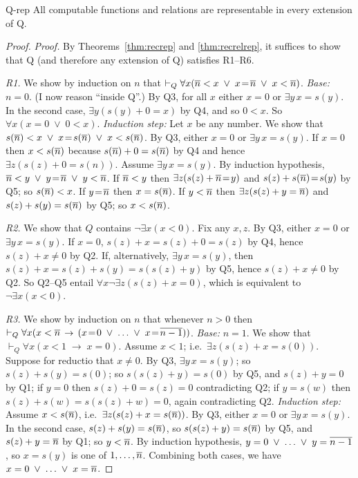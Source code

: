 \begin{theorem}{}{Q-rep}
  All computable functions and relations are representable in every extension of Q.
\end{theorem}
\begin{proof}
  \emph{Proof.}
  By Theorems~\ref{thm:recrep} and \ref{thm:recrelrep},
  it suffices to show that Q (and therefore any extension of Q) satisfies R1--R6.

  \emph{R1.} %
  We show by induction on $n$ that $\vdash_Q \forall x (\overline{n} < x \;\lor\; x\!=\!\overline{n} \;\lor\; x < \overline{n})$.
  \emph{Base:} $n=0$.
  (I now reason ``inside Q''.)
  By Q3,
  for all $x$ either $x=0$ or $\exists y\, x=s(y)$.
  In the second case,
  $\exists y (s(y) + 0\!=\!x)$ by Q4,
  and so $0<x$.
  So $\forall x(x\!=\!0 \;\lor\; 0 < x)$.
  \emph{Induction step:}
  Let $x$ be any number.
  We show that $s(\overline{n}) < x \;\lor\; x\!=\!s(\overline{n}) \;\lor\; x < s(\overline{n})$.
  By Q3,
  either $x=0$ or $\exists y\, x=s(y)$.
  If $x=0$ then $x < s(\overline{n})$ because
  $s(\overline{n}) + 0=s(\overline{n})$ by Q4 and hence $\exists z(s(z) + 0=s(n))$.
  Assume $\exists y\, x=s(y)$.
  By induction hypothesis,
  $\overline{n} < y \;\lor\; y\!=\!\overline{n} \;\lor\; y < \overline{n}$.
  If $\overline{n} < y$ then
  $\exists z(s(z) + \overline{n}\!=\!y)$ and
  $s(z) + s(\overline{n})\!=\!s(y)$ by Q5;
  so $s(\overline{n}) < x$.
  If $y\!=\!\overline{n}$ then $x = s(\overline{n})$.
  If $y < \overline{n}$ then
  $\exists z(s(z) + y = \overline{n})$ and
  $s(z) + s(y) = s(\overline{n})$ by Q5;
  so $x < s(\overline{n})$.

  \smallskip%
  \emph{R2.}
  We show that $Q$ contains $\neg \exists x (x < 0)$.
  Fix any $x,z$.
  By Q3, either $x = 0$ or $\exists y\, x = s(y)$.
  If $x=0$,
  $s(z) + x = s(z) + 0 = s(z)$ by Q4, hence $s(z) + x \neq 0$ by Q2.
  If, alternatively, $\exists y\, x = s(y)$,
  then $s(z) + x = s(z) + s(y) = s(s(z) + y)$ by Q5,
  hence $s(z) + x \neq 0$ by Q2.
  So Q2--Q5 entail $\forall x \neg \exists z(s(z) + x = 0)$,
  which is equivalent to $\neg \exists x (x < 0)$.
  
  \smallskip%
  \emph{R3.} %
  We show by induction on $n$ that whenever $n > 0$ then
  $\vdash_Q \forall x (x < \num{n} \;\to\; ({x\!=\!0} \;\lor\; \ldots \;\lor\; {x\!=\!\num{n-1}}))$.
  \emph{Base:} $n=1$.
  We show that $\vdash_Q \forall x (x < \num{1} \;\to\; x = 0)$.
  Assume $x < \num{1}$;
  i.e.\ $\exists z (s(z) + x = s(0))$.
  Suppose for reductio that $x\!\not= 0$.
  By Q3, $\exists y\, x\!=\!s(y)$;
  so $s(z)+s(y) = s(0)$;
  so $s(s(z)+y) = s(0)$ by Q5, 
  and $s(z)+y = 0$ by Q1;
  if $y=0$ then $s(z)+0=s(z)=0$ contradicting Q2;
  if $y=s(w)$ then $s(z)+s(w)=s(s(z)+w)=0$, again contradicting Q2.
  \emph{Induction step:}
  Assume $x < s(\overline{n})$,
  i.e.\ $\exists z(s(z) + x = s(\overline{n}))$.
  By Q3,
  either $x=0$ or $\exists y\, x=s(y)$.
  In the second case,
  $s(z) + s(y) = s(\overline{n})$,
  so $s(s(z) + y) = s(\overline{n})$ by Q5,
  and $s(z) + y = \overline{n}$ by Q1;
  so $y < \overline{n}$.
  By induction hypothesis,
  $y = 0 \;\lor\; \ldots \;\lor\; y = \overline{n-1}$,
  so $x= s(y)$ is one of $1, \ldots, \overline{n}$.
  Combining both cases, we have $x=0 \;\lor\; \ldots \;\lor\; x = \overline{n}$.


\end{proof}
